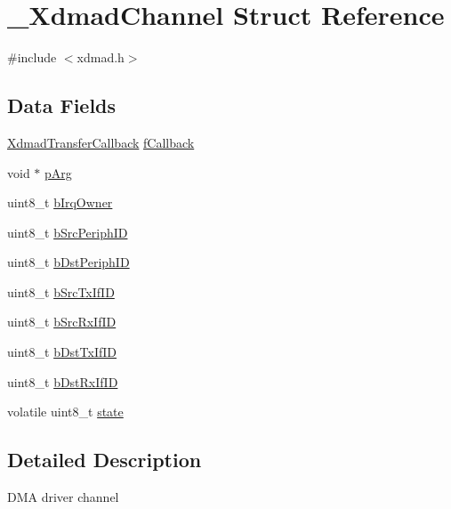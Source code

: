 \hypertarget{struct__XdmadChannel}{}\section{\+\_\+\+Xdmad\+Channel Struct Reference}
\label{struct__XdmadChannel}


{\ttfamily \#include $<$xdmad.\+h$>$}

\subsection*{Data Fields}
\begin{DoxyCompactItemize}
\item 
\mbox{\hyperlink{group__dmad__structs_gaa36d3490b9c6967852605416acf658be}{Xdmad\+Transfer\+Callback}} \mbox{\hyperlink{struct__XdmadChannel_aa89d0187546eab974c56bb5669d18fb7}{f\+Callback}}
\item 
void $\ast$ \mbox{\hyperlink{struct__XdmadChannel_ac40b54db72c5916ccdc24f0505c99d5b}{p\+Arg}}
\item 
uint8\+\_\+t \mbox{\hyperlink{struct__XdmadChannel_a83cfdbf5d118e81410186a4886f820d6}{b\+Irq\+Owner}}
\item 
uint8\+\_\+t \mbox{\hyperlink{struct__XdmadChannel_a6939d1df01e527720e44da5f14498073}{b\+Src\+Periph\+ID}}
\item 
uint8\+\_\+t \mbox{\hyperlink{struct__XdmadChannel_a49ef40b46904a3c90268e6f0c05d03c0}{b\+Dst\+Periph\+ID}}
\item 
uint8\+\_\+t \mbox{\hyperlink{struct__XdmadChannel_a60d028ea01ce2326e58862b1c90e2e31}{b\+Src\+Tx\+If\+ID}}
\item 
uint8\+\_\+t \mbox{\hyperlink{struct__XdmadChannel_ae1c8ba7f6fa1bbcabd71e9de242774dd}{b\+Src\+Rx\+If\+ID}}
\item 
uint8\+\_\+t \mbox{\hyperlink{struct__XdmadChannel_a83052af47e6ec92ecca0d9d17f0706e9}{b\+Dst\+Tx\+If\+ID}}
\item 
uint8\+\_\+t \mbox{\hyperlink{struct__XdmadChannel_a14c7f57b0c37f6e6959a6a0387fbe14e}{b\+Dst\+Rx\+If\+ID}}
\item 
volatile uint8\+\_\+t \mbox{\hyperlink{struct__XdmadChannel_a42ebc62f45f06c99062faaf7dbc313b5}{state}}
\end{DoxyCompactItemize}


\subsection{Detailed Description}
D\+MA driver channel 

